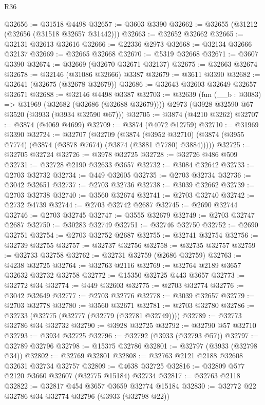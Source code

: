 \begin{lexlean}{R36}
\begin{coremodule}
@32656 := @31518 @4498
@32657 := @3603 @3390
@32662 := @32655 (@31212 (@32656 (@31518 @32657 @31442)))
@32663 := @32652 @32662
@32665 := @32131 @32613 @32616
@32666 := @22336 @2973
@32668 := @32134 @32666 @32137
@32669 := @32665 @32668
@32670 := @5319 @32668
@32671 := @3607 @3390
@32674 := @32669 (@32670 @32671 @32137)
@32675 := @32663 @32674
@32678 := @32146 (@31086 @32666) @3387
@32679 := @3611 @3390
@32682 := @32641 (@32675 (@32678 @32679))
@32686 := @32643 @32603 @32649 @32657 @32671
@32688 := @32146 @4498 @3387
@32703 := @32639
    (fun (__b : @3083) => @31969 (@32682 (@32686 (@32688 @32679))))
    @2973
    (@3928 @32590 @67 @3520 (@3933 (@3934 @32590 @67)))
@32705 := @3874 (@4210 @3262)
@32707 := @3874 (@4069 @4699)
@32709 := @3874 (@4072 @12759)
@32710 := @31969 @3390
@32724 := @32707
    (@32709
      (@3874
        (@3952 @32710)
        (@3874 (@3955 @7774) (@3874 (@3878 @7674) (@3874 (@3881 @7780) @3884)))))
@32725 := @32705 @32724
@32726 := @3978 @32725
@32728 := @32726 @486 @509
@32731 := @32728 @2190 @32633 @3657
@32732 := @3084 @32642
@32733 := @2703 @32732
@32734 := @449 @32605
@32735 := @2703 @32734
@32736 := @3042 @32651
@32737 := @2703 @32736
@32738 := @3039 @32662
@32739 := @2703 @32738
@32740 := @3560 @32674
@32741 := @2703 @32740
@32742 := @2732 @4739
@32744 := @2703 @32742 @2687
@32745 := @2690 @32744
@32746 := @2703 @32745
@32747 := @3555 @32679
@32749 := @2703 @32747 @2687
@32750 := @30283 @32749
@32751 := @32746 @32750
@32752 := @2690 @32751
@32754 := @2703 @32752 @2687
@32755 := @32741 @32754
@32756 := @32739 @32755
@32757 := @32737 @32756
@32758 := @32735 @32757
@32759 := @32733 @32758
@32762 := @32731 @32759 (@2686 @32759)
@32763 := @4238 @32725
@32764 := @32763 @2116
@32769 := @32764 @2189 @3657 @32632 @32732 @32758
@32772 := @15350 @32725 @443 @3657
@32773 := @32772 @34
@32774 := @449 @32603
@32775 := @2703 @32774
@32776 := @3042 @32649
@32777 := @2703 @32776
@32778 := @3039 @32657
@32779 := @2703 @32778
@32780 := @3560 @32671
@32781 := @2703 @32780
@32786 := @32733 (@32775 (@32777 (@32779 (@32781 @32749))))
@32789 := @32773 @32786 @34 @32732
@32790 := @3928 @32725
@32792 := @32790 @57 @32710
@32793 := @3934 @32725
@32796 := @32792 (@3933 (@32793 @57))
@32797 := @32789 @32796
@32798 := @15375 @32786
@32801 := @32797 (@3933 (@32798 @34))
@32802 := @32769 @32801
@32808 := @32763 @2121 @2188 @32608 @32631 @32734 @32757
@32809 := @4638 @32725
@32816 := @32809 @577 @2120 @3660 @32607 (@32775 @15184) @32734
@32817 := @32763 @2118
@32822 := @32817 @454 @3657 @3659 @32774 @15184
@32830 := @32772 @22 @32786 @34 @32774 @32796 (@3933 (@32798 @22))

\end{coremodule}
\end{lexlean}
